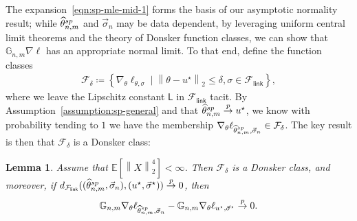 \documentclass[11pt]{article}
\newcommand{\Ep}{\mathbb{E}}
\newcommand{\mc}[1]{\mathcal{#1}}
\newcommand{\norm}[1]{\left\|{#1}\right\|} %
\newcommand{\what}[1]{\widehat{#1}}
\newcommand{\sem}{^{\textup{sp}}}
\newcommand{\Flink}{\mathcal{F}_{\mathsf{link}}}
\newcommand{\lipconst}{\mathsf{L}}
\newcommand{\loss}{\ell}
\newcommand{\ltwo}[1]{\norm{#1}_2} %
\newcommand{\<}{\langle} %
\renewcommand{\>}{\rangle}
\newcommand{\cp}{\stackrel{p}{\rightarrow}}
\newcommand{\defeq}{\coloneqq}
\newcommand{\opt}{^\star}
\newcommand{\spe}{\what{\theta}\sem_{n,m}} %
\newcommand{\G}{\mathbb{G}}
\newtheorem{lemma}[claim]{Lemma}
\begin{document}
The expansion~\eqref{eqn:sp-mle-mid-1} forms the basis of our asymptotic
normality result; while $\spe$ and $\vec{\sigma}_n$ may be data
dependent, by leveraging uniform central limit theorems and the
theory of Donsker function classes, we can show that
$\G_{n,m} \nabla \loss$ has an appropriate normal limit.
To that end,
define the
function classes
\begin{align*}
	\mc{F}_{\delta}
	\defeq \left\{\nabla_\theta \loss_{\theta, \sigma}
	\mid \ltwo{\theta - u\opt} \leq \delta,
	\sigma \in \Flink \right\},
\end{align*}
where we leave the Lipschitz constant $\lipconst$ in $\Flink$ tacit.
By Assumption~\ref{assumption:sp-general} and that $\spe \cp u\opt$, we know
with probability tending to $1$ we have the membership $
\nabla_\theta\ell_{\spe, \vec{\sigma}_n} \in \mc{F}_\delta$. The key
result is then that $\mathcal{F}_\delta$ is a Donsker class:
\begin{lemma}
  \label{lemma:donsker-sp}
  Assume that $\Ep [\ltwo{X}^4] < \infty$.  Then $\mc{F}_\delta$ is a
  Donsker class, and moreover, if $d_{\Flink}((\spe, \vec{\sigma}_n),
  (u\opt, \vec{\sigma}\opt)) \cp 0$, then
  \begin{equation*}
    \G_{n,m} \nabla_\theta\ell_{\spe, \vec{\sigma}_n}
    - \G_{n,m} \nabla_\theta\ell_{u\opt, \vec{\sigma}\opt} \cp 0.
  \end{equation*}
\end{lemma}
\end{document}
